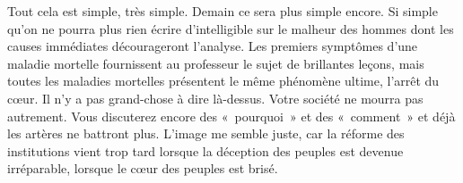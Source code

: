 \documentclass[french,twoside]{book} %
\newcommand{\astertri}{\medskip\par\centerline{\color{rubric}\large\selectfont{\syms ✻\,✻\,✻}}\medskip\par}%
\begin{document}
Tout cela est simple, très simple. Demain ce sera plus simple encore. Si simple qu’on ne pourra plus rien écrire d’intelligible sur le malheur des hommes dont les causes immédiates décourageront l’analyse. Les premiers symptômes d’une maladie mortelle fournissent au professeur le sujet de brillantes leçons, mais toutes les maladies mortelles présentent le même phénomène ultime, l’arrêt du cœur. Il n’y a pas grand-chose à dire là-dessus. Votre société ne mourra pas autrement. Vous discuterez encore des « pourquoi » et des « comment » et déjà les artères ne battront plus. L’image me semble juste, car la réforme des institutions vient trop tard lorsque la déception des peuples est devenue irréparable, lorsque le cœur des peuples est brisé.\par

\astertri
\end{document}
